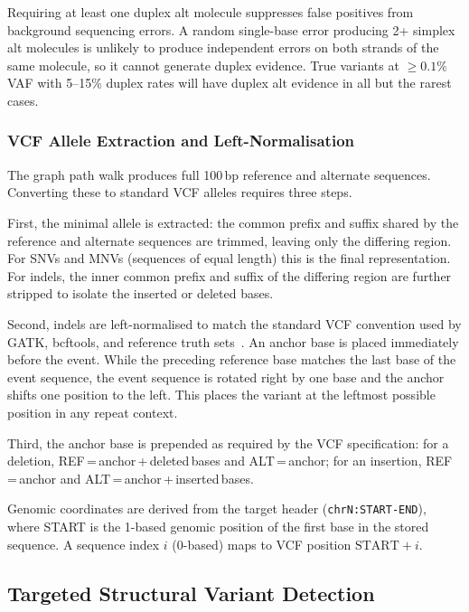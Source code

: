 Requiring at least one duplex alt molecule suppresses false positives from background sequencing errors.
A random single-base error producing 2+ simplex alt molecules is unlikely to produce independent errors on both strands of the same molecule, so it cannot generate duplex evidence.
True variants at $\ge 0.1\%$ VAF with 5--15\% duplex rates will have duplex alt evidence in all but the rarest cases.

\subsubsection{VCF Allele Extraction and Left-Normalisation}

The graph path walk produces full 100\,bp reference and alternate sequences.
Converting these to standard VCF alleles requires three steps.

First, the minimal allele is extracted: the common prefix and suffix shared by the reference and alternate sequences are trimmed, leaving only the differing region.
For SNVs and MNVs (sequences of equal length) this is the final representation.
For indels, the inner common prefix and suffix of the differing region are further stripped to isolate the inserted or deleted bases.

Second, indels are left-normalised to match the standard VCF convention used by GATK, bcftools, and reference truth sets~\cite{tan2015}.
An anchor base is placed immediately before the event.
While the preceding reference base matches the last base of the event sequence, the event sequence is rotated right by one base and the anchor shifts one position to the left.
This places the variant at the leftmost possible position in any repeat context.

Third, the anchor base is prepended as required by the VCF specification: for a deletion, REF\,=\,anchor\,+\,deleted\,bases and ALT\,=\,anchor; for an insertion, REF\,=\,anchor and ALT\,=\,anchor\,+\,inserted\,bases.

Genomic coordinates are derived from the target header (\texttt{chrN:START-END}), where START is the 1-based genomic position of the first base in the stored sequence. A sequence index $i$ (0-based) maps to VCF position $\text{START} + i$.

\subsection{Targeted Structural Variant Detection}
\label{sec:sv-detection}

